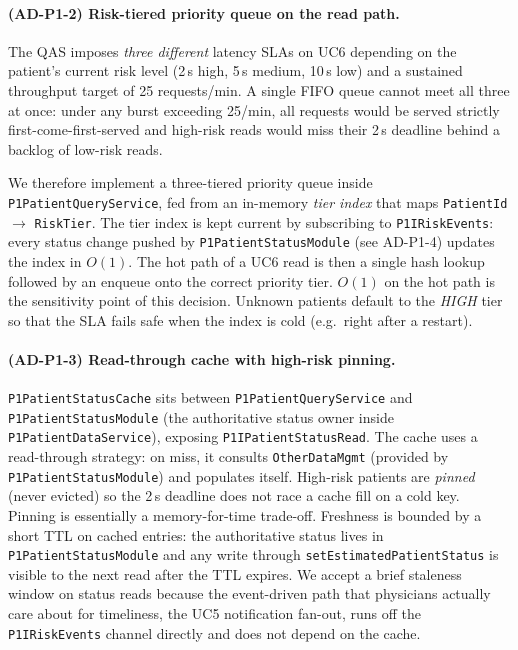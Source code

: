 \paragraph{(AD-P1-2) Risk-tiered priority queue on the read path.}
The QAS imposes \emph{three different} latency SLAs on UC6 depending on
the patient's current risk level (2\,s high, 5\,s medium, 10\,s low) and
a sustained throughput target of 25 requests/min. A single FIFO queue
cannot meet all three at once: under any burst exceeding 25/min, all
requests would be served strictly first-come-first-served and high-risk
reads would miss their 2\,s deadline behind a backlog of low-risk reads.

We therefore implement a three-tiered priority queue inside
\texttt{P1PatientQueryService}, fed from an in-memory \emph{tier index}
that maps \texttt{PatientId} $\rightarrow$ \texttt{RiskTier}. The tier
index is kept current by subscribing to \texttt{P1IRiskEvents}: every
status change pushed by \texttt{P1PatientStatusModule} (see AD-P1-4)
updates the index in $O(1)$. The hot path of a UC6 read is then a single
hash lookup followed by an enqueue onto the correct priority tier.
$O(1)$ on the hot path is the sensitivity point of this decision.
Unknown patients default to the \emph{HIGH} tier so that the SLA fails
safe when the index is cold (e.g.\ right after a restart).

\paragraph{(AD-P1-3) Read-through cache with high-risk pinning.}
\texttt{P1PatientStatusCache} sits between \texttt{P1PatientQueryService}
and \texttt{P1PatientStatusModule} (the authoritative status owner
inside \texttt{P1PatientDataService}), exposing
\texttt{P1IPatientStatusRead}. The cache uses a read-through strategy:
on miss, it consults \texttt{OtherDataMgmt} (provided by
\texttt{P1PatientStatusModule}) and populates itself. High-risk patients
are \emph{pinned} (never evicted) so the 2\,s deadline does not race a
cache fill on a cold key. Pinning is essentially a memory-for-time
trade-off. Freshness is bounded by a short TTL on cached entries: the
authoritative status lives in \texttt{P1PatientStatusModule} and any
write through \texttt{setEstimatedPatientStatus} is visible to the next
read after the TTL expires. We accept a brief staleness window on
status reads because the event-driven path that physicians actually
care about for timeliness, the UC5 notification fan-out, runs off
the \texttt{P1IRiskEvents} channel directly and does not depend on the
cache.

